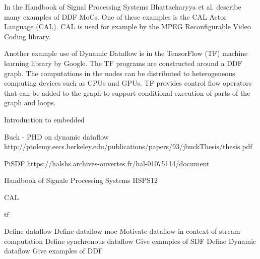 In the Handbook of Signal Processing Systems Bhattacharyya et al. describe many examples of DDF MoCs. One of these examples is the CAL Actor Language (CAL). CAL is used for example by the MPEG Reconfigurable Video Coding library.

Another example use of Dynamic Dataflow is in the TensorFlow (TF) machine learning library by Google. The TF programs are constructed around a DDF graph.  The computations in the nodes can be distributed to heterogeneous computing devices such as CPUs and GPUs. TF provides control flow operators that can be added to the graph to support conditional execution of parts of the graph and loops.

Introduction to embedded \cite{lee2015introduction}

Buck - PHD on dynamic dataflow http://ptolemy.eecs.berkeley.edu/publications/papers/93/jbuckThesis/thesis.pdf
\cite{buck1993scheduling}

PiSDF https://halshs.archives-ouvertes.fr/hal-01075114/document
\cite{desnos2013pimm}

Handbook of Signale Processing Systems HSPS12
\cite{bhattacharyya2013handbook}

CAL \cite{eker2003cal}

tf \cite{tensorflow2015-whitepaper}

Define dataflow
Define dataflow moc
Motivate dataflow in context of stream computation
Define synchronous dataflow
Give examples of SDF
Define Dynamic dataflow
Give examples of DDF

